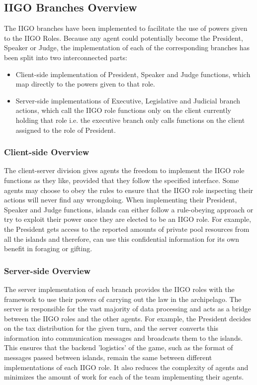 \subsection{IIGO Branches Overview}
The IIGO branches have been implemented to facilitate the use of powers given to the IIGO Roles. Because any agent could potentially become the President, Speaker or Judge, the implementation of each of the corresponding branches has been split into two interconnected parts:

\begin{itemize}
\item Client-side implementation of President, Speaker and Judge functions, which map directly to the powers given to that role.
\item Server-side implementations of Executive, Legislative and Judicial branch actions, which call the IIGO role functions only on the client currently holding that role i.e. the executive branch only calls functions on the client assigned to the role of President.
\end{itemize}

\subsubsection{Client-side Overview}
The client-server division gives agents the freedom to implement the IIGO role functions as they like, provided that they follow the specified interface. Some agents may choose to obey the rules to ensure that the IIGO role inspecting their actions will never find any wrongdoing. When implementing their President, Speaker and Judge functions, islands can either follow a rule-obeying approach or try to exploit their power once they are elected to be an IIGO role. For example, the President gets access to the reported amounts of private pool resources from all the islands and therefore, can use this confidential information for its own benefit in foraging or gifting.

\subsubsection{Server-side Overview}
The server implementation of each branch provides the IIGO roles with the framework to use their powers of carrying out the law in the archipelago. The server is responsible for the vast majority of data processing and acts as a bridge between the IIGO roles and the other agents. For example, the President decides on the tax distribution for the given turn, and the server converts this information into communication messages and broadcasts them to the islands. This ensures that the backend 'logistics' of the game, such as the format of messages passed between islands, remain the same between different implementations of each IIGO role. It also reduces the complexity of agents and minimizes the amount of work for each of the team implementing their agents.

